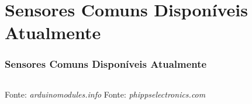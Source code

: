 \documentclass[xcolor=dvipsnames, aspectratio=169]{beamer}
\begin{document}
\section[Sensores Comuns Disponíveis Atualmente]{Sensores Comuns Disponíveis Atualmente} 
\begin{frame}[fragile]
	\frametitle{Sensores Comuns Disponíveis Atualmente}
	\begin{columns}[t]
		\centering
		{Fonte: \textit{arduinomodules.info}}
		{Fonte: \textit{phippselectronics.com}}
	\end{columns}
\end{frame}
\end{document}
